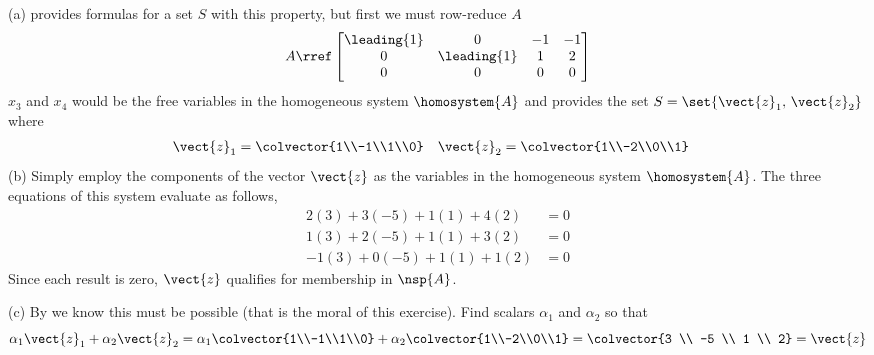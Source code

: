 (a)\quad
{} provides formulas for a set $S$ with this property, but first we must row-reduce $A$
%
\begin{equation*}
A\rref
\begin{bmatrix}
 \leading{1} & 0 & -1 & -1 \\
 0 & \leading{1} & 1 & 2 \\
 0 & 0 & 0 & 0
\end{bmatrix}
\end{equation*}
%
$x_3$ and $x_4$ would be the free variables in the homogeneous system $\homosystem{A}$ and  provides the set $S=\set{\vect{z}_1,\,\vect{z}_2}$ where
%
\begin{align*}
\vect{z}_1
&=
\colvector{1\\-1\\1\\0}
&
\vect{z}_2
&=
\colvector{1\\-2\\0\\1}
\end{align*}
%
(b)\quad
Simply employ the components of the vector $\vect{z}$ as the variables in the homogeneous system $\homosystem{A}$.  The three equations of this system evaluate as follows,
%
\begin{align*}
 2(3) + 3(-5)+ 1(1) + 4(2)&=0 \\
 1(3) + 2(-5)+ 1(1) + 3(2)&= 0\\
 -1(3) + 0(-5)+ 1(1) + 1(2)&=0
\end{align*}
%
Since each result is zero, $\vect{z}$ qualifies for membership in $\nsp{A}$.\par
%
(c)\quad 
By  we know this must be possible (that is the moral of this exercise).  Find scalars $\alpha_1$ and $\alpha_2$ so that
%
\begin{equation*}
\alpha_1\vect{z}_1+\alpha_2\vect{z}_2
=
\alpha_1\colvector{1\\-1\\1\\0}+\alpha_2\colvector{1\\-2\\0\\1}
=
\colvector{3 \\ -5 \\ 1 \\ 2}
=
\vect{z}
\end{equation*}
